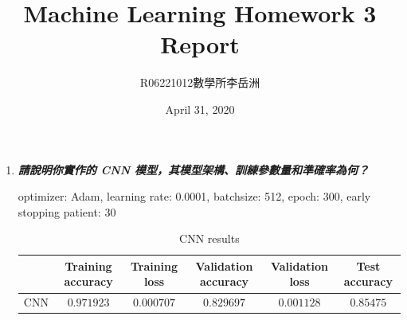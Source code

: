 \documentclass[a4paper,11pt]{article}
\title{Machine Learning Homework 3 Report}
\author{R06221012\hspace{0.2cm}數學所\hspace{0.2cm}李岳洲}
\date{April 31, 2020}
\begin{document}
\maketitle

\begin{enumerate}
	\item \textit{\textbf{請說明你實作的 CNN 模型，其模型架構、訓練參數量和準確率為何？}}

	optimizer: Adam, learning rate: 0.0001, batchsize: 512, epoch: 300, early stopping patient: 30\\

		\begin{table}[htp]
			\begin{center}
				\begin{tabular}{ | c | c | c | c | c | c |}
				  	\hline
			  		& Training accuracy & Training loss & Validation accuracy & Validation loss & Test accuracy\\[0.5ex] 
			  		\hline \hline
			  		CNN & $0.971923$ & $0.000707$ & $0.829697$ & $0.001128$ & $0.85475$\\[0.2ex]
			  		\hline
				\end{tabular}
				\caption{CNN results}
			\end{center}
		\end{table}


\end{enumerate}
\end{document}
